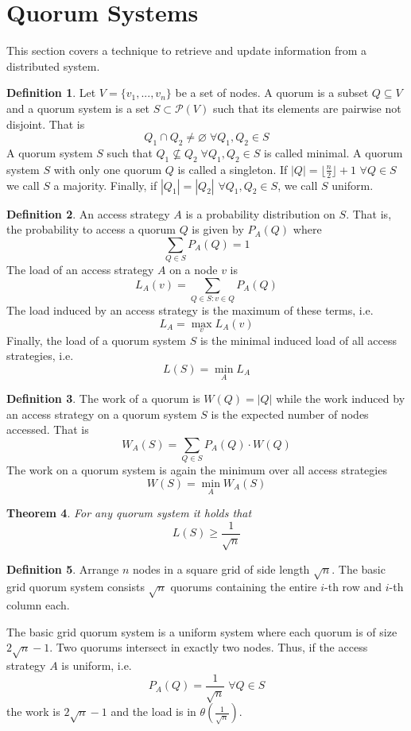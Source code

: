 \documentclass[a4paper, 12pt]{article}
\theoremstyle{plain}
\newtheorem{theorem}{Theorem}[section] %
\theoremstyle{definition}
\newtheorem{definition}[theorem]{Definition} %
\theoremstyle{lemma}
\theoremstyle{remark}
\theoremstyle{corollary}
\theoremstyle{example}
\begin{document}
\section{Quorum Systems}
	This section covers a technique to retrieve and update information from a distributed system.
	\begin{definition}
		Let $V = \{v_1,...,v_n\}$ be a set of nodes. A quorum is a subset $Q \subseteq V$ and a quorum system is a set $S \subset \mathcal{P}(V)$ such that its elements are pairwise not disjoint. That is \[Q_1 \cap Q_2 \neq \varnothing \; \forall Q_1, Q_2 \in S\]
		A quorum system $S$ such that $Q_1 \not \subseteq Q_2\; \forall Q_1,Q_2 \in S$ is called minimal. A quorum system $S$ with only one quorum $Q$ is called a singleton. If $\left|Q\right| = \lfloor \frac{n}{2} \rfloor +1$ $\forall Q \in S$ we call $S$ a majority. Finally, if $\left|Q_1\right| = \left|Q_2\right|$ $\forall Q_1,Q_2 \in S$, we call $S$ uniform.
	\end{definition}
	\begin{definition}
		An access strategy $A$ is a probability distribution on $S$. That is, the probability to access a quorum $Q$ is given by $P_A(Q)$ where \[\sum_{Q \in S} P_A(Q) = 1\]
		The load of an access strategy $A$ on a node $v$ is \[L_A(v) = \sum_{Q \in S: v \in Q} P_A(Q)\]
		The load induced by an access strategy is the maximum of these terms, i.e. \[L_A = \max_v L_A(v)\]
		Finally, the load of a quorum system $S$ is the minimal induced load of all access strategies, i.e. \[L(S) = \min_A L_A\]
	\end{definition}
	\begin{definition}
		The work of a quorum is $W(Q) = \left|Q\right|$ while the work induced by an access strategy on a quorum system $S$ is the expected number of nodes accessed. That is \[W_A(S) = \sum_{Q \in S} P_A(Q) \cdot W(Q)\]
		The work on a quorum system is again the minimum over all access strategies \[W(S) = \min_A W_A(S)\]
	\end{definition}
	\begin{theorem}
		For any quorum system it holds that \[L(S) \geq \frac{1}{\sqrt{n}}\]
	\end{theorem}
	\begin{definition}
		Arrange $n$ nodes in a square grid of side length $\sqrt{n}$. The basic grid quorum system consists $\sqrt{n}$ quorums containing the entire $i$-th row and $i$-th column each.
	\end{definition}
	The basic grid quorum system is a uniform system where each quorum is of size $2\sqrt{n}-1$. Two quorums intersect in exactly two nodes. Thus, if the access strategy $A$ is uniform, i.e. \[P_A(Q) = \frac{1}{\sqrt{n}} \; \forall Q \in S\] the work is $2\sqrt{n}-1$ and the load is in $\theta(\frac{1}{\sqrt{n}})$.\\
\end{document}

